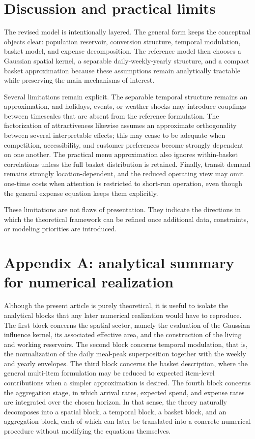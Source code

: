 \documentclass{article}
\begin{document}
\section{Discussion and practical limits}
\label{sec:discussion}

The revised model is intentionally layered. The general form keeps the conceptual objects clear: population reservoir, conversion structure, temporal modulation, basket model, and expense decomposition. The reference model then chooses a Gaussian spatial kernel, a separable daily-weekly-yearly structure, and a compact basket approximation because these assumptions remain analytically tractable while preserving the main mechanisms of interest.

Several limitations remain explicit. The separable temporal structure remains an approximation, and holidays, events, or weather shocks may introduce couplings between timescales that are absent from the reference formulation. The factorization of attractiveness likewise assumes an approximate orthogonality between several interpretable effects; this may cease to be adequate when competition, accessibility, and customer preferences become strongly dependent on one another. The practical menu approximation also ignores within-basket correlations unless the full basket distribution is retained. Finally, transit demand remains strongly location-dependent, and the reduced operating view may omit one-time costs when attention is restricted to short-run operation, even though the general expense equation keeps them explicitly.

These limitations are not flaws of presentation. They indicate the directions in which the theoretical framework can be refined once additional data, constraints, or modeling priorities are introduced.

\appendix

\section{Appendix A: analytical summary for numerical realization}
\label{sec:appendix-implementation}

Although the present article is purely theoretical, it is useful to isolate the analytical blocks that any later numerical realization would have to reproduce. The first block concerns the spatial sector, namely the evaluation of the Gaussian influence kernel, its associated effective area, and the construction of the living and working reservoirs. The second block concerns temporal modulation, that is, the normalization of the daily meal-peak superposition together with the weekly and yearly envelopes. The third block concerns the basket description, where the general multi-item formulation may be reduced to expected item-level contributions when a simpler approximation is desired. The fourth block concerns the aggregation stage, in which arrival rates, expected spend, and expense rates are integrated over the chosen horizon. In that sense, the theory naturally decomposes into a spatial block, a temporal block, a basket block, and an aggregation block, each of which can later be translated into a concrete numerical procedure without modifying the equations themselves.
\end{document}
